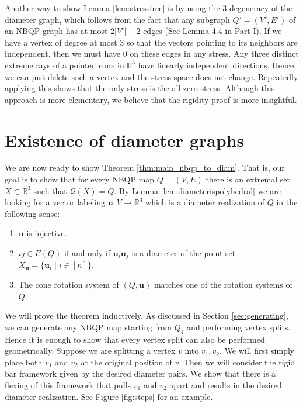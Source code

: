 \documentclass{article}
\newcounter{example}
\newcommand{\vu}[0]{\mathbf{u}}
\newcommand{\R}[0]{\mathbb{R}}
\newcommand{\qt}{\mathcal{Q}}
\begin{document}
    Another way to show Lemma \ref{lem:stressfree} is by using the 3-degeneracy of the diameter graph, which follows from the fact that any subgraph $Q'=(V',E')$ of an NBQP graph  has at most $2|V'|-2$ edges (See Lemma 4.4 in Part I). If we have a vertex of degree at most 3 so that the vectors pointing to its neighbors are independent, then we must have 0 on these edges in any stress. Any three distinct extreme rays of a pointed cone in $\R^3$ have linearly independent directions. Hence, we can just delete such a vertex and the stress-space does not change. Repeatedly applying this shows that the only stress is the all zero stress. Although this approach is more elementary, we believe that the rigidity proof is more insightful. 



\section{Existence of diameter graphs}\label{sec:qtexsists}
We are now ready to show Theorem \ref{thm:main_nbqp_to_diam}. That is, our goal is to show that for every NBQP map $Q=(V,E)$ there is an extremal set $X\subset \R^3$ such that $\qt(X)=Q$. By Lemma \ref{lem:diameterispolyhedral} we are looking for a vector labeling $\vu:V\rightarrow \R^3$ which is a diameter realization of $Q$ in the following sense:

\begin{enumerate}[label=\alph*)]
    \item $\vu$ is injective.
        \item $ij\in E(Q)$ if and only if $\vu_i\vu_j$ is a diameter of the point set $X_\vu=\{\vu_i\mid i\in [n] \}$.
        \item The cone rotation system of $(Q,\vu)$ matches one of the rotation systems of $Q$.
\end{enumerate}
    
We will prove the theorem inductively. As discussed in Section \ref{sec:generating}, we can generate any NBQP map starting from $Q_4$ and performing vertex splits. Hence it is enough to show that every vertex split can also be performed geometrically. Suppose we are splitting a vertex $v$ into $v_1,v_2$. We will first simply place both $v_1$ and $v_2$ at the original position of $v$. Then we will consider the rigid bar framework given by the desired diameter pairs. We show that there is a flexing of this framework that pulls $v_1$ and $v_2$ apart and results in the desired diameter realization. See Figure \ref{fig:steps} for an example.
\end{document}
